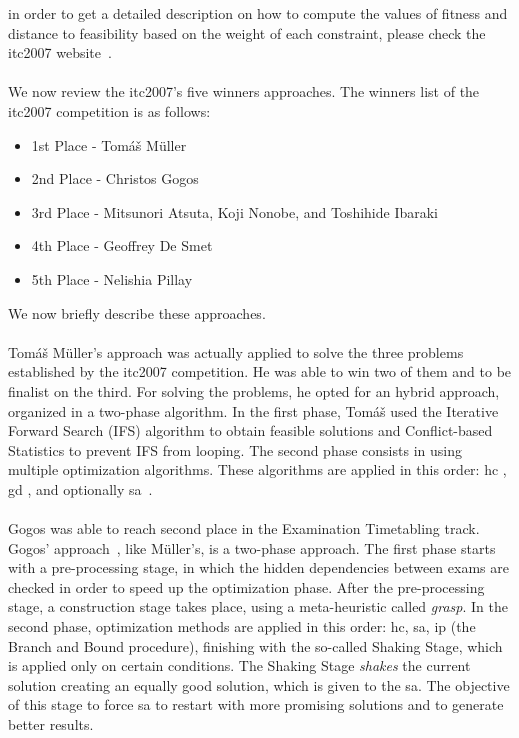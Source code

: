 in order to get a detailed description on how to compute the values of fitness and distance to feasibility based on the weight of each constraint, please check the \gls{itc2007} website~\cite{McCollum2007}.\\
\\
We now review the \gls{itc2007}'s five winners approaches. The winners list of the \gls{itc2007} competition is as follows:
\begin{itemize}
	\item 1st Place - Tom\'{a}\v{s} M\"{u}ller
	\item 2nd Place - Christos Gogos
	\item 3rd Place - Mitsunori Atsuta, Koji Nonobe, and Toshihide Ibaraki
	\item 4th Place - Geoffrey De Smet
	\item 5th Place - Nelishia Pillay
\end{itemize}
We now briefly describe these approaches.\\
\\
Tom\'{a}\v{s} M\"{u}ller's approach \cite{Mueller2009} was actually applied to solve the three problems established by the \gls{itc2007} competition. He was able to win two of them and to be finalist on the third. For solving the problems, he opted for an hybrid approach, organized in a two-phase algorithm. In the first phase, Tom\'{a}\v{s} used the Iterative Forward Search (IFS) algorithm \cite{Mueller2005} to obtain feasible solutions and Conflict-based Statistics \cite{Mueller2004} to prevent IFS from looping. The second phase consists in using multiple optimization algorithms. These algorithms are applied in this order: \gls{hc} \cite{Russell2010}, \gls{gd} \cite{Dueck1993}, and optionally \gls{sa}~\cite{Kirkpatrick1983}.\\
\\
Gogos was able to reach second place in the Examination Timetabling track. Gogos' approach~\cite{Gogos2012}, like M\"{u}ller's, is a two-phase approach. The first phase starts with a pre-processing stage, in which the hidden dependencies between exams are checked in order to speed up the optimization phase. After the pre-processing stage, a construction stage takes place, using a meta-heuristic called \textit{\gls{grasp}}. In the second phase, optimization methods are applied in this order: \gls{hc}, \gls{sa}, \gls{ip} (the Branch and Bound procedure), finishing with the so-called Shaking Stage, which is applied only on certain conditions. The Shaking Stage \textit{shakes} the current solution creating an equally good solution, which is given to the \gls{sa}. The objective of this stage to force \gls{sa} to restart with more promising solutions and to generate better results.\\
